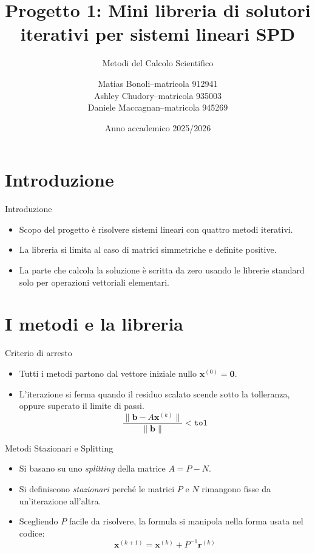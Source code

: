 \documentclass[11pt,aspectratio=169,xcolor=dvipsnames]{beamer}
\title{Progetto 1: Mini libreria di solutori iterativi per sistemi lineari SPD}
\subtitle{Metodi del Calcolo Scientifico}
\author{
    \begin{tabular}{rcl}
    Matias Bonoli & -- & matricola 912941 \\
    Ashley Chudory & -- & matricola 935003 \\
    Daniele Maccagnan & -- & matricola 945269
    \end{tabular}
}
\date{Anno accademico 2025/2026}
\begin{document}
\begin{frame}[plain]
    \titlepage
\end{frame}

\section{Introduzione}

\begin{frame}{Introduzione}
    \begin{itemize}
        \item Scopo del progetto è risolvere sistemi lineari con quattro metodi iterativi.
        \item La libreria si limita al caso di matrici simmetriche e definite positive.
        \item La parte che calcola la soluzione è scritta da zero usando le librerie standard solo per operazioni vettoriali elementari.
    \end{itemize}
\end{frame}

\section{I metodi e la libreria}

\begin{frame}{Criterio di arresto}
    \begin{itemize}
        \item Tutti i metodi partono dal vettore iniziale nullo $\mathbf{x}^{(0)}=\mathbf{0}$.
        \item L'iterazione si ferma quando il residuo scalato scende sotto la tolleranza, oppure superato il limite di passi.
        \[ \frac{\|\mathbf{b} - A\mathbf{x}^{(k)}\|}{\|\mathbf{b}\|} < \texttt{tol} \]
    \end{itemize}
\end{frame}

\begin{frame}{Metodi Stazionari e Splitting}
    \begin{itemize}
        \item Si basano su uno \emph{splitting} della matrice $A = P - N$.
        \item Si definiscono \emph{stazionari} perché le matrici $P$ e $N$ rimangono fisse da un'iterazione all'altra.
        \item Scegliendo $P$ facile da risolvere, la formula si manipola nella forma usata nel codice:
        \[ \mathbf{x}^{(k+1)} = \mathbf{x}^{(k)} + P^{-1}\mathbf{r}^{(k)} \]
    \end{itemize}
\end{frame}
\end{document}
